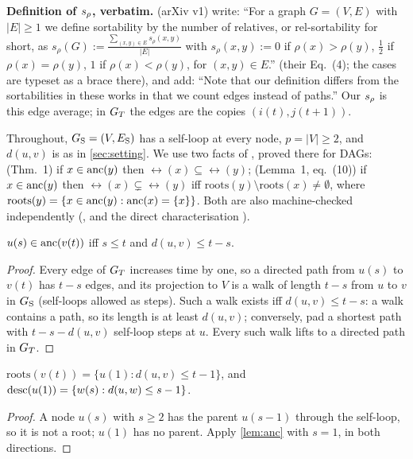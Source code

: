 \textbf{Definition of $s_\rho$, verbatim.} \citet[Sec.~2.2]{reisach2026topological}
(arXiv v1) write: ``For a graph $G=(V,E)$ with $|E|\ge1$ we define sortability
by the number of relatives, or rel-sortability for short, as
$s_\rho(G):=\frac{\sum_{(x,y)\in E}s_\rho(x,y)}{|E|}$ with
$s_\rho(x,y):=0$ if $\rho(x)>\rho(y)$, $\frac12$ if $\rho(x)=\rho(y)$, $1$ if
$\rho(x)<\rho(y)$, for $(x,y)\in E$.'' (their Eq.~(4); the cases are typeset as a
brace there), and add: ``Note that our definition differs from the sortabilities
in these works in that we count edges instead of paths.'' Our $s_\rho$ is this
edge average; in $\GT$ the edges are the copies $(i(t),j(t{+}1))$.

Throughout, $G_{\mathrm S}=(V,E_{\mathrm S})$ has a self-loop at every node, $p=|V|\ge2$, and
$d(u,v)$ is as in \cref{sec:setting}. We use two facts of
\citet{reisach2026topological}, proved there for DAGs: (Thm.~1) if
$x\in\mathrm{anc}(y)$ then $\rel(x)\subseteq\rel(y)$; (Lemma~1, eq.~(10)) if
$x\in\mathrm{anc}(y)$ then $\rel(x)\subsetneq\rel(y)$ iff $\mathrm{roots}(y)\setminus
\mathrm{roots}(x)\ne\emptyset$, where $\mathrm{roots}(y)=\{x\in\mathrm{anc}(y):\mathrm{anc}(x)=\{x\}\}$.
Both are also machine-checked independently
(, and the direct characterisation
).

\begin{lemma}[ancestors in $\GT$]\label{lem:anc}
$u(s)\in\mathrm{anc}(v(t))$ iff $s\le t$ and $d(u,v)\le t-s$.
\end{lemma}
\begin{proof}
Every edge of $\GT$ increases time by one, so a directed path from $u(s)$ to
$v(t)$ has $t-s$ edges, and its projection to $V$ is a walk of length $t-s$
from $u$ to $v$ in $G_{\mathrm S}$ (self-loops allowed as steps). Such a walk exists iff
$d(u,v)\le t-s$: a walk contains a path, so its length is at least
$d(u,v)$; conversely, pad a shortest path with $t-s-d(u,v)$ self-loop steps at
$u$. Every such walk lifts to a directed path in $\GT$.
\end{proof}

\begin{lemma}[roots]\label{lem:roots}
$\mathrm{roots}(v(t))=\{u(1):d(u,v)\le t-1\}$, and
$\mathrm{desc}(u(1))=\{w(s):d(u,w)\le s-1\}$.
\end{lemma}
\begin{proof}
A node $u(s)$ with $s\ge2$ has the parent $u(s-1)$ through the self-loop, so
it is not a root; $u(1)$ has no parent. Apply \cref{lem:anc} with $s=1$, in
both directions.
\end{proof}

